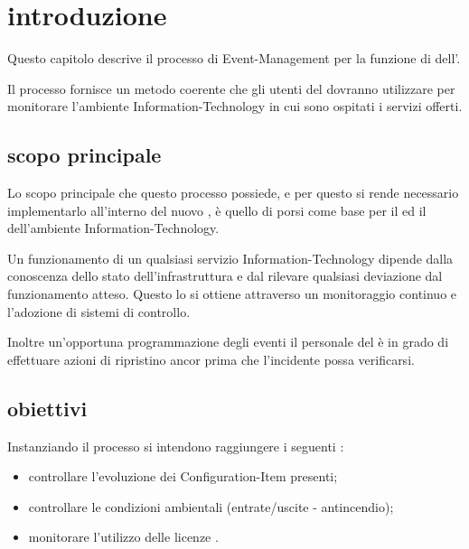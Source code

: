 %
%
\section[Introduzione]{introduzione}
\label{rf-introduction}
Questo capitolo descrive il processo di \acf{Event-Management} per la funzione di  dell'\entity{}.

Il processo fornisce un metodo coerente che gli utenti del  dovranno utilizzare per monitorare l'ambiente \acs{Information-Technology} in cui sono ospitati i servizi offerti.

\subsection[Scopo principale]{scopo principale}
\label{em-introduction-scope}
Lo scopo principale che questo processo possiede, e per questo si rende necessario implementarlo all'interno del nuovo , è quello di porsi come base per il  ed il  dell'ambiente \acs{Information-Technology}.

Un funzionamento  di un qualsiasi servizio \acs{Information-Technology} dipende dalla conoscenza dello stato dell'infrastruttura e dal rilevare qualsiasi deviazione dal funzionamento atteso. Questo lo si ottiene attraverso un monitoraggio continuo e l'adozione di sistemi di controllo.

Inoltre un'opportuna programmazione degli eventi il personale del  è in grado di effettuare azioni di ripristino ancor prima che l'incidente possa verificarsi.

\subsection[Obiettivi]{obiettivi}
\label{em-introduction-objectives}
Instanziando il processo si intendono raggiungere i seguenti :

\begin{itemize}
\item{controllare l'evoluzione dei \ac{Configuration-Item} presenti;}
\item{controllare le condizioni ambientali (entrate/uscite - antincendio);}
\item{monitorare l'utilizzo delle licenze .}
\end{itemize}


